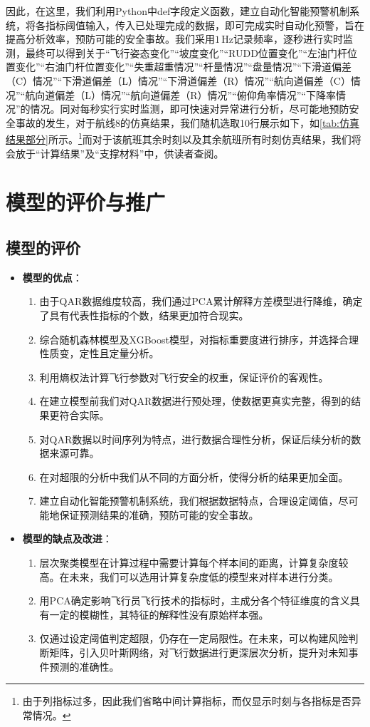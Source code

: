 \documentclass{MathorCupModeling}
\begin{document}
因此，在这里，我们利用Python中def字段定义函数，建立自动化智能预警机制系统，将各指标阈值输入，传入已处理完成的数据，即可完成实时自动化预警，旨在提高分析效率，预防可能的安全事故。我们采用$1\,\text{Hz}$记录频率，逐秒进行实时监测，最终可以得到关于“飞行姿态变化”“坡度变化”“RUDD位置变化”“左油门杆位置变化”“右油门杆位置变化”“失重超重情况”“杆量情况”“盘量情况”“下滑道偏差（C）情况”“下滑道偏差（L）情况”“下滑道偏差（R）情况”“航向道偏差（C）情况”“航向道偏差（L）情况”“航向道偏差（R）情况”“俯仰角率情况”“下降率情况”的情况。同对每秒实行实时监测，即可快速对异常进行分析，尽可能地预防安全事故的发生，对于航线8的仿真结果，我们随机选取10行展示如下，如\textcolor{blue}{\cref{tab:仿真结果部分}}所示。\textcolor{blue}{\footnote{由于列指标过多，因此我们省略中间计算指标，而仅显示时刻与各指标是否异常情况。}}而对于该航班其余时刻以及其余航班所有时刻仿真结果，我们将会放于“计算结果”及“支撑材料”中，供读者查阅。
  
\section{模型的评价与推广}
	\subsection{模型的评价}
	\begin{itemize}
		\item \textbf{模型的优点}：
			\begin{enumerate}
				\item 由于QAR数据维度较高，我们通过PCA累计解释方差模型进行降维，确定了具有代表性指标的个数，结果更加符合现实。
				\item 综合随机森林模型及XGBoost模型，对指标重要度进行排序，并选择合理性质变，定性且定量分析。
				\item 利用熵权法计算飞行参数对飞行安全的权重，保证评价的客观性。
				\item 在建立模型前我们对QAR数据进行预处理，使数据更真实完整，得到的结果更符合实际。
				\item 对QAR数据以时间序列为特点，进行数据合理性分析，保证后续分析的数据来源可靠。
				\item 在对超限的分析中我们从不同的方面分析，使得分析的结果更加全面。
				\item 建立自动化智能预警机制系统，我们根据数据特点，合理设定阈值，尽可能地保证预测结果的准确，预防可能的安全事故。
			\end{enumerate}
		\item \textbf{模型的缺点及改进}：
			\begin{enumerate}
				\item 层次聚类模型在计算过程中需要计算每个样本间的距离，计算复杂度较高。在未来，我们可以选用计算复杂度低的模型来对样本进行分类。
				\item 用PCA确定影响飞行员飞行技术的指标时，主成分各个特征维度的含义具有一定的模糊性，其特征的解释性没有原始样本强。
				\item 仅通过设定阈值判定超限，仍存在一定局限性。在未来，可以构建风险判断矩阵，引入贝叶斯网络，对飞行数据进行更深层次分析，提升对未知事件预测的准确性。
			\end{enumerate}
	\end{itemize}
\end{document}
